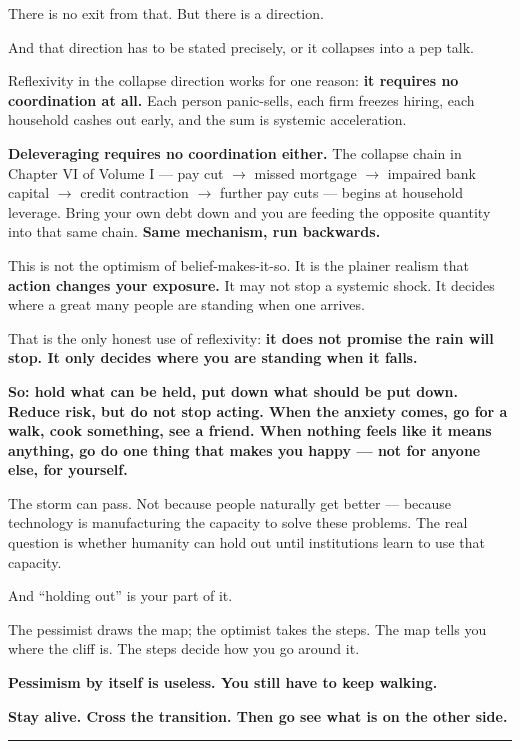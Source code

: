 \documentclass[11pt,a4paper]{article}
\begin{document}
There is no exit from that. But there is a direction.

And that direction has to be stated precisely, or it collapses into a pep talk.

Reflexivity in the collapse direction works for one reason: \textbf{it requires no coordination at all.} Each person panic-sells, each firm freezes hiring, each household cashes out early, and the sum is systemic acceleration.

\textbf{Deleveraging requires no coordination either.} The collapse chain in Chapter VI of Volume I --- pay cut $\to$ missed mortgage $\to$ impaired bank capital $\to$ credit contraction $\to$ further pay cuts --- begins at household leverage. Bring your own debt down and you are feeding the opposite quantity into that same chain. \textbf{Same mechanism, run backwards.}

This is not the optimism of belief-makes-it-so. It is the plainer realism that \textbf{action changes your exposure.} It may not stop a systemic shock. It decides where a great many people are standing when one arrives.

That is the only honest use of reflexivity: \textbf{it does not promise the rain will stop. It only decides where you are standing when it falls.}

\textbf{So: hold what can be held, put down what should be put down. Reduce risk, but do not stop acting. When the anxiety comes, go for a walk, cook something, see a friend. When nothing feels like it means anything, go do one thing that makes you happy --- not for anyone else, for yourself.}

The storm can pass. Not because people naturally get better --- because technology is manufacturing the capacity to solve these problems. The real question is whether humanity can hold out until institutions learn to use that capacity.

And ``holding out'' is your part of it.

The pessimist draws the map; the optimist takes the steps. The map tells you where the cliff is. The steps decide how you go around it.

\textbf{Pessimism by itself is useless. You still have to keep walking.}

\textbf{Stay alive. Cross the transition. Then go see what is on the other side.}


\vspace{2em}
\begin{center}
\rule{0.5\textwidth}{0.5pt}
\end{center}
\vspace{1em}
\end{document}
